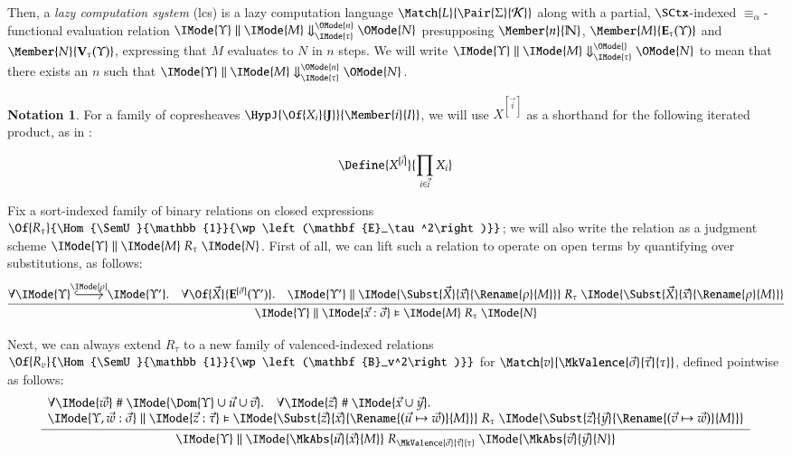 \documentclass[11pt]{article}
\theoremstyle{definition}
\theoremstyle{notation}
\newtheorem*{notation*}{Notation}
\theoremstyle{remark}
\numberwithin{equation}{section}
\newcommand\Pow[1]{\wp\left(#1\right)}
\newcommand\EvalN[5]{\IMode{#1}\parallel\IMode{#4}\Downarrow^{\OMode{#3}}_{\IMode{#2}}\OMode{#5}}
\newcommand\Eval[4]{\EvalN{#1}{#2}{}{#3}{#4}}
\newcommand\Exprs{\mathbf{E}}
\newcommand\Values{\mathbf{V}}
\newcommand\BExprs{\mathbf{B}}
\newcommand\Naturals{\mathbb{N}}
\begin{document}
Then, a \emph{lazy computation system} (lcs) is a lazy computation language
$\Match{L}{\Pair{\Sigma}{\CanOperators}}$ along with a partial, $\SCtx$-indexed
$\equiv_\alpha$-functional evaluation relation
$\EvalN{\Upsilon}{\tau}{n}{M}{N}$ presupposing $\Member{n}{\Naturals}$,
$\Member{M}{\Exprs_\tau(\Upsilon)}$ and $\Member{N}{\Values_\tau(\Upsilon)}$,
expressing that $M$ evaluates to $N$ in $n$ steps.  We will write
$\Eval{\Upsilon}{\tau}{M}{N}$ to mean that there exists an $n$ such that
$\EvalN{\Upsilon}{\tau}{n}{M}{N}$.

\newcommand\PBinRel[4]{\IMode{#2}\parallel\IMode{#3}\mathrel{#1}\IMode{#4}}
\newcommand\HPBinRel[5]{\IMode{#2}\parallel\IMode{#3}\vDash\IMode{#4}\mathrel{#1}\IMode{#5}}

\begin{notation*}
  For a family of copresheaves $\HypJ{\Of{X_i}{\SemU}}{\Member{i}{I}}$, we will
  use $X^{[\vec{i}]}$ as a shorthand for the following iterated product, as
  in \cite{sterling-morrison:2015}:

  \[
    \Define{
      X^{[\vec{i}]}
    }{
      \prod_{i\in\vec{i}}
        X_i
    }
  \]
\end{notation*}

Fix a sort-indexed family of binary relations on closed expressions
$\Of{R_\tau}{\Hom{\SemU}{\mathbb{1}}{\Pow{\Exprs_\tau^2}}}$; we will
also write the relation as a judgment scheme
$\PBinRel{R_\tau}{\Upsilon}{M}{N}$. First of all, we can lift such a relation
to operate on open terms by quantifying over substitutions, as follows:
\[
  \infer{
    \HPBinRel{R_\tau}{\Upsilon}{\vec{x}:\vec{\sigma}}{M}{N}
  }{
    \forall
      \begin{tikzcd}[cramped, ampersand replacement = \&]
         \IMode{\Upsilon} \arrow[r,hook,"\IMode{\rho}"] \&\IMode{\Upsilon'}
      \end{tikzcd}.
    \quad
    \forall \Of{\vec{X}}{\Exprs^{[\vec{\sigma}]}(\Upsilon')}.
    \quad
    \PBinRel{R_\tau}{\Upsilon'}{
      \Subst{\vec{X}}{\vec{x}}{\Rename{\rho}{M}}
    }{
      \Subst{\vec{X}}{\vec{x}}{\Rename{\rho}{M}}
    }
  }
\]

Next, we can always extend $R_\tau$ to a new
family of valenced-indexed relations
$\Of{R_v}{\Hom{\SemU}{\mathbb{1}}{\Pow{\BExprs_v^2}}}$ for
$\Match{v}{\MkValence{\vec{\sigma}}{\vec{\tau}}{\tau}}$, defined pointwise as
follows:
\[
  \infer{
    \PBinRel{R_{\MkValence{\vec{\sigma}}{\vec{\tau}}{\tau}}}{\Upsilon}{
      \MkAbs{\vec{u}}{\vec{x}}{M}
    }{
      \MkAbs{\vec{v}}{\vec{y}}{N}
    }
  }{
    \begin{array}{l}
      \forall\IMode{\vec{w}}\mathrel{\#}\IMode{\Dom{\Upsilon}\cup\vec{u}\cup\vec{v}}.\quad
      \forall\IMode{\vec{z}}\mathrel{\#}\IMode{\vec{x}\cup\vec{y}}.\\
      \HPBinRel{R_\tau}{\Upsilon,\vec{w}:\vec{\sigma}}{\vec{z}:\vec{\tau}}{
        \Subst{\vec{z}}{\vec{x}}{
          \Rename{(\vec{u}\mapsto\vec{w})}{M}
        }
      }{
        \Subst{\vec{z}}{\vec{y}}{
          \Rename{(\vec{v}\mapsto\vec{w})}{M}
        }
      }
    \end{array}
  }
\]
\end{document}
